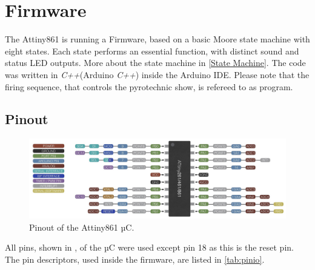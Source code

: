 \section{Firmware}
\label{Firmware}
The Attiny861 is running a Firmware, based on a basic Moore state machine with eight states. Each state performs an essential function, with distinct sound and status LED outputs. More about the state machine in \cref{State Machine}. The code was written in \textit{C++}(Arduino \textit{C++}) inside the Arduino IDE. Please note that the firing sequence, that controls the pyrotechnic show, is refereed to as program.

\subsection{Pinout}

\begin{figure}[!ht]
    \centering
    \includegraphics[width=13cm]{./Figures/attiny861_pinout.jpg}
    \caption{Pinout of the Attiny861 µC.}
    \label{fig:attiny861_pinout}     
\end{figure}


\noindent All pins, shown in , of the µC were used except pin 18 as this is the reset pin. The pin descriptors, used inside the firmware, are listed in \cref{tab:pinio}.

